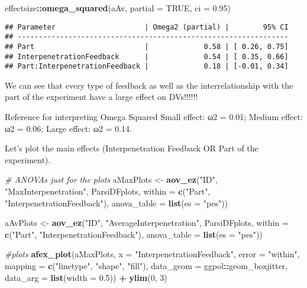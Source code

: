 \documentclass[
]{article}
\newenvironment{Shaded}{\begin{snugshade}}{\end{snugshade}}
\newcommand{\CommentTok}[1]{\textcolor[rgb]{0.56,0.35,0.01}{\textit{#1}}}
\newcommand{\DataTypeTok}[1]{\textcolor[rgb]{0.13,0.29,0.53}{#1}}
\newcommand{\DecValTok}[1]{\textcolor[rgb]{0.00,0.00,0.81}{#1}}
\newcommand{\FloatTok}[1]{\textcolor[rgb]{0.00,0.00,0.81}{#1}}
\newcommand{\KeywordTok}[1]{\textcolor[rgb]{0.13,0.29,0.53}{\textbf{#1}}}
\newcommand{\NormalTok}[1]{#1}
\newcommand{\OperatorTok}[1]{\textcolor[rgb]{0.81,0.36,0.00}{\textbf{#1}}}
\newcommand{\OtherTok}[1]{\textcolor[rgb]{0.56,0.35,0.01}{#1}}
\newcommand{\StringTok}[1]{\textcolor[rgb]{0.31,0.60,0.02}{#1}}
\begin{document}
\begin{Shaded}
\begin{Highlighting}[]
\NormalTok{effectsize}\OperatorTok{::}\KeywordTok{omega_squared}\NormalTok{(aAv, }\DataTypeTok{partial =} \OtherTok{TRUE}\NormalTok{, }\DataTypeTok{ci =} \FloatTok{0.95}\NormalTok{)}
\end{Highlighting}
\end{Shaded}

\begin{verbatim}
## Parameter                     | Omega2 (partial) |        95% CI
## ----------------------------------------------------------------
## Part                          |             0.58 | [ 0.26, 0.75]
## InterpenetrationFeedback      |             0.54 | [ 0.35, 0.66]
## Part:InterpenetrationFeedback |             0.18 | [-0.01, 0.34]
\end{verbatim}

We can see that every type of feedback as well as the interrelationship
with the part of the experiment have a large effect on DVs!!!!!!

Reference for interpreting Omega Squared Small effect: ω2 = 0.01; Medium
effect: ω2 = 0.06; Large effect: ω2 = 0.14.

Let's plot the main effects (Interpenetration Feedback OR Part of the
experiment).

\begin{Shaded}
\begin{Highlighting}[]
\CommentTok{# ANOVAs just for the plots}
\NormalTok{aMaxPlots <-}\StringTok{ }\KeywordTok{aov_ez}\NormalTok{(}\StringTok{"ID"}\NormalTok{, }\StringTok{"MaxInterpenetration"}\NormalTok{, ParsiDFplots,}
             \DataTypeTok{within =} \KeywordTok{c}\NormalTok{(}\StringTok{"Part"}\NormalTok{, }\StringTok{"InterpenetrationFeedback"}\NormalTok{),}
             \DataTypeTok{anova_table =} \KeywordTok{list}\NormalTok{(}\DataTypeTok{es =} \StringTok{"pes"}\NormalTok{))}

\NormalTok{aAvPlots <-}\StringTok{ }\KeywordTok{aov_ez}\NormalTok{(}\StringTok{"ID"}\NormalTok{, }\StringTok{"AverageInterpenetration"}\NormalTok{, ParsiDFplots,}
             \DataTypeTok{within =} \KeywordTok{c}\NormalTok{(}\StringTok{"Part"}\NormalTok{, }\StringTok{"InterpenetrationFeedback"}\NormalTok{),}
             \DataTypeTok{anova_table =} \KeywordTok{list}\NormalTok{(}\DataTypeTok{es =} \StringTok{"pes"}\NormalTok{))}

\CommentTok{#plots}
\KeywordTok{afex_plot}\NormalTok{(aMaxPlots, }\DataTypeTok{x =} \StringTok{"InterpenetrationFeedback"}\NormalTok{, }\DataTypeTok{error =} \StringTok{"within"}\NormalTok{, }
                \DataTypeTok{mapping =} \KeywordTok{c}\NormalTok{(}\StringTok{"linetype"}\NormalTok{, }\StringTok{"shape"}\NormalTok{, }\StringTok{"fill"}\NormalTok{),}
                \DataTypeTok{data_geom =}\NormalTok{ ggpol}\OperatorTok{::}\NormalTok{geom_boxjitter, }
                \DataTypeTok{data_arg =} \KeywordTok{list}\NormalTok{(}\DataTypeTok{width =} \FloatTok{0.5}\NormalTok{)) }\OperatorTok{+}
\StringTok{            }\KeywordTok{ylim}\NormalTok{(}\DecValTok{0}\NormalTok{, }\DecValTok{3}\NormalTok{)}
\end{Highlighting}
\end{Shaded}
\end{document}
